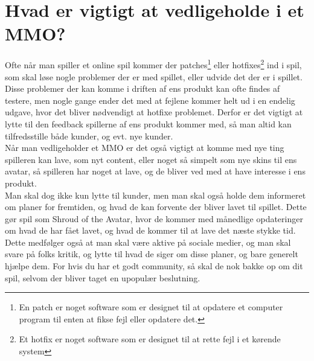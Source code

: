 \chapter{Hvad er vigtigt at vedligeholde i et MMO?}
Ofte når man spiller et online spil kommer der patches\footnote{En patch er noget software som er designet til at opdatere et computer program til enten at fikse fejl eller opdatere det.} eller hotfixes\footnote{Et hotfix er noget software som er designet til at rette fejl i et kørende system} ind i spil, som skal løse nogle problemer der er med spillet, eller udvide det der er i spillet. Disse problemer der kan komme i driften af ens produkt kan ofte findes af testere, men nogle gange ender det med at fejlene kommer helt ud i en endelig udgave, hvor det bliver nødvendigt at hotfixe problemet. Derfor er det vigtigt at lytte til den feedback spillerne af ens produkt kommer med, så man altid kan tilfredsstille både kunder, og evt. nye kunder.\\
Når man vedligeholder et MMO er det også vigtigt at komme med nye ting spilleren kan lave, som nyt content, eller noget så simpelt som nye skins til ens avatar, så spilleren har noget at lave, og de bliver ved med at have interesse i ens produkt.\cite{WoW}\\
Man skal dog ikke kun lytte til kunder, men man skal også holde dem informeret om planer for fremtiden, og hvad de kan forvente der bliver lavet til spillet. Dette gør spil som Shroud of the Avatar\cite{SOTA}, hvor de kommer med månedlige opdateringer om hvad de har fået lavet, og hvad de kommer til at lave det næste stykke tid\cite{SOTAForum}. Dette medfølger også at man skal være aktive på sociale medier, og man skal svare på folks kritik, og lytte til hvad de siger om disse planer, og bare generelt hjælpe dem\cite{GreatMMO}. For hvis du har et godt community, så skal de nok bakke op om dit spil, selvom der bliver taget en upopulær beslutning.\cite{MMOChampion}
